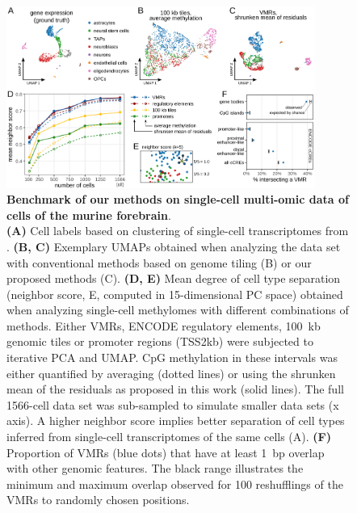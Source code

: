 \documentclass[10pt]{article}
\begin{document}
\begin{figure}[p]
	\begin{center}
		\includegraphics[width=0.9\textwidth]{figures/Fig_benchmark.png}
	\end{center}
	\caption{\small \textbf{Benchmark of our methods on single-cell multi-omic data of cells of the murine forebrain}.\\
		\textbf{(A)} Cell labels based on clustering of single-cell transcriptomes from \citet{kremer_scnmt}.
		\textbf{(B, C)} Exemplary UMAPs obtained when analyzing the data set with conventional methods based on genome tiling (B) or our proposed methods (C).
		\textbf{(D, E)} Mean degree of cell type separation (neighbor score, E, computed in 15-dimensional PC space) obtained when analyzing single-cell methylomes with different combinations of methods.
		Either VMRs, ENCODE regulatory elements, 100~kb genomic tiles or promoter regions (TSS\textpm2kb) were subjected to iterative PCA and UMAP.
		CpG methylation in these intervals was either quantified by averaging (dotted lines) or using the shrunken mean of the residuals as proposed in this work (solid lines).
		The full 1566-cell data set was sub-sampled to simulate smaller data sets (x axis).
		A higher neighbor score implies better separation of cell types inferred from single-cell transcriptomes of the same cells (A).
		\textbf{(F)} Proportion of VMRs (blue dots) that have at least 1~bp overlap with other genomic features.
		The black range illustrates the minimum and maximum overlap observed for 100 reshufflings of the VMRs to randomly chosen positions.
	}
	\label{fig:score}
\end{figure}
\end{document}
